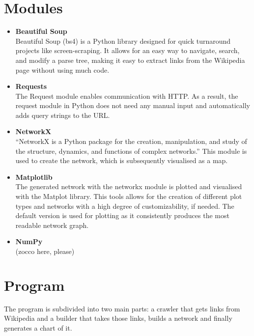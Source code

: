 \documentclass[10pt]{article}
\begin{document}
\section{Modules}

 \begin{itemize}    %
        \item\textbf{Beautiful Soup}\\
	Beautiful Soup (bs4) is a Python library designed for quick turnaround projects like screen-scraping. It allows for an easy way to navigate, search, and modify a parse tree, making it 	easy to extract links from the Wikipedia page without using much code. \cite{cru} 
 
        \item \textbf{Requests}\\
 	The Request module enables communication with HTTP. As a result, the request module in Python does not need any manual input and automatically adds query strings to the  	
	URL.   \cite{req}
	
        \item \textbf{NetworkX}\\
	``NetworkX is a Python package for the creation, manipulation, and study of the structure, dynamics, and functions of complex networks.'' \cite{net} This module is used to create 
	the network, which is subsequently visualised as a map. 
	
        \item \textbf{Matplotlib}\\
        The generated network with the networkx module is plotted and visualised with the Matplot library. This tools allows for the creation of different plot types and networks with a high 	
        degree of customizability, if needed. The default version is used for plotting as it consistently produces the most readable network graph. 
        
        \item \textbf{NumPy}\\
        
        (zocco here, please)
        
        
    \end{itemize}
 

\section{Program}
The program is subdivided into two main parts: a crawler that gets links from Wikipedia and a builder that takes those links, builds a network and finally generates a chart of it.
\end{document}
